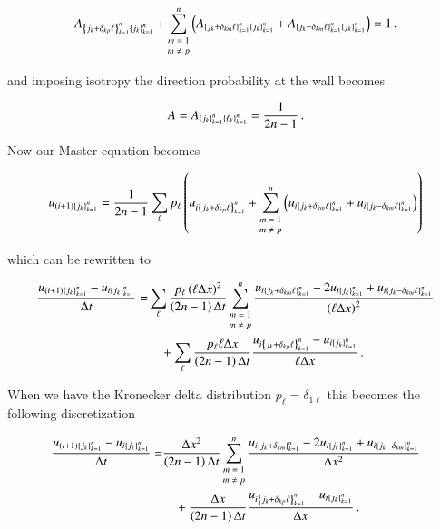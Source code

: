 \documentclass[11pt,english,a4paper]{article}
\begin{document}
\begin{flushleft}
\begin{align*}
A_{\left\lbrace{j_k+\delta_{kp}\ell}\right\rbrace_{k=1}^n\left\lbrace{j_k}\right\rbrace_{k=1}^n} + \sum_{\scriptsize\begin{matrix}m=1\\ m\neq p\end{matrix}}^n \left({A_{\left\lbrace{j_k+\delta_{km}\ell}\right\rbrace_{k=1}^n\left\lbrace{j_k}\right\rbrace_{k=1}^n}+A_{\left\lbrace{j_k-\delta_{km}\ell}\right\rbrace_{k=1}^n\left\lbrace{j_k}\right\rbrace_{k=1}^n}}\right) = 1 \,,
\end{align*}

and imposing isotropy the direction probability at the wall becomes

\begin{align*}
A = A_{\left\lbrace{j_k}\right\rbrace_{k=1}^n\left\lbrace{\ell_k}\right\rbrace_{k=1}^n} = \frac{1}{2n-1} \,.
\end{align*}

Now our Master equation becomes

\begin{align*}
u_{(i+1)\left\lbrace{j_k}\right\rbrace_{k=1}^n} = \frac{1}{2n-1}\sum_\ell p_\ell \left({u_{i\left\lbrace{j_k+\delta_{kp}\ell}\right\rbrace_{k=1}^n}+\sum_{\scriptsize\begin{matrix}m=1\\ m\neq p\end{matrix}}^n \left({u_{i\left\lbrace{j_k+\delta_{km}\ell}\right\rbrace_{k=1}^n} + u_{i\left\lbrace{j_k-\delta_{km}\ell}\right\rbrace_{k=1}^n}}\right)}\right)
\end{align*}

which can be rewritten to 

\begin{align*}
\frac{u_{(i+1)\left\lbrace{j_k}\right\rbrace_{k=1}^n}-u_{i\left\lbrace{j_k}\right\rbrace_{k=1}^n}}{\Delta t} =& \sum_{\ell}\frac{p_\ell \left({\ell \Delta x}\right)^2}{\left({2n-1}\right)\Delta t}\sum_{\scriptsize\begin{matrix}m=1\\ m\neq p\end{matrix}}^n\frac{u_{i\left\lbrace{j_k+\delta_{km}\ell}\right\rbrace_{k=1}^n} - 2 u_{i\left\lbrace{j_k}\right\rbrace_{k=1}^n} + u_{i\left\lbrace{j_k-\delta_{km}\ell}\right\rbrace_{k=1}^n}}{\left({\ell\Delta x}\right)^2} 
\\
&\quad +\sum_{\ell}\frac{p_\ell\ell \Delta x}{\left({2n-1}\right)\Delta t} \frac{u_{i\left\lbrace{j_k+\delta_{kp}\ell}\right\rbrace_{k=1}^n} - u_{i\left\lbrace{j_k}\right\rbrace_{k=1}^n}}{\ell\Delta x} \,.
\end{align*}

When we have the Kronecker delta distribution $p_\ell = \delta_{1\ell}$ this becomes the following discretization

\begin{align*}
\frac{u_{(i+1)\left\lbrace{j_k}\right\rbrace_{k=1}^n}-u_{i\left\lbrace{j_k}\right\rbrace_{k=1}^n}}{\Delta t} =& \frac{\Delta x^2}{\left({2n-1}\right)\Delta t}\sum_{\scriptsize\begin{matrix}m=1\\ m\neq p\end{matrix}}^n\frac{u_{i\left\lbrace{j_k+\delta_{km}}\right\rbrace_{k=1}^n} - 2 u_{i\left\lbrace{j_k}\right\rbrace_{k=1}^n} + u_{i\left\lbrace{j_k-\delta_{km}}\right\rbrace_{k=1}^n}}{\Delta x^2} 
\\&\quad + \frac{\Delta x}{\left({2n-1}\right)\Delta t} \frac{u_{i\left\lbrace{j_k+\delta_{kp}\ell}\right\rbrace_{k=1}^n} - u_{i\left\lbrace{j_k}\right\rbrace_{k=1}^n}}{\Delta x} \,.
\end{align*}


\end{flushleft}
\end{document}
